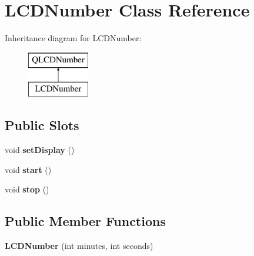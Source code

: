 \hypertarget{class_l_c_d_number}{\section{L\-C\-D\-Number Class Reference}
\label{class_l_c_d_number}
}
Inheritance diagram for L\-C\-D\-Number\-:\begin{figure}[H]
\begin{center}
\leavevmode
\includegraphics[height=2.000000cm]{class_l_c_d_number}
\end{center}
\end{figure}
\subsection*{Public Slots}
\begin{DoxyCompactItemize}
\item 
\hypertarget{class_l_c_d_number_a7aefd33408d5bde99dac66ec9bf33b19}{void {\bfseries set\-Display} ()}\label{class_l_c_d_number_a7aefd33408d5bde99dac66ec9bf33b19}

\item 
\hypertarget{class_l_c_d_number_a1aab4805806348ba24e3d1c40115b019}{void {\bfseries start} ()}\label{class_l_c_d_number_a1aab4805806348ba24e3d1c40115b019}

\item 
\hypertarget{class_l_c_d_number_ac20c231ee84e02cab47d7b4d73fb86b1}{void {\bfseries stop} ()}\label{class_l_c_d_number_ac20c231ee84e02cab47d7b4d73fb86b1}

\end{DoxyCompactItemize}
\subsection*{Public Member Functions}
\begin{DoxyCompactItemize}
\item 
\hypertarget{class_l_c_d_number_aebf9a2d58b07e6073a8ba260e3395c64}{{\bfseries L\-C\-D\-Number} (int minutes, int seconds)}\label{class_l_c_d_number_aebf9a2d58b07e6073a8ba260e3395c64}

\end{DoxyCompactItemize}

